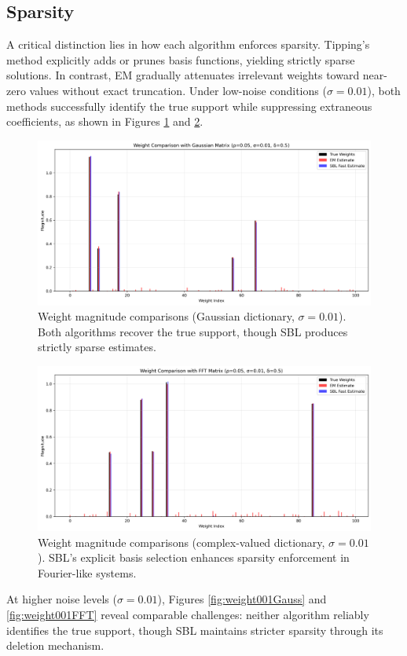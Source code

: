 \documentclass{article}
\begin{document}
\subsection{Sparsity}
A critical distinction lies in how each algorithm enforces sparsity. Tipping’s method explicitly adds or prunes basis functions, yielding strictly sparse solutions. In contrast, EM gradually attenuates irrelevant weights toward near-zero values without exact truncation. Under low-noise conditions ($\sigma=0.01$), both methods successfully identify the true support while suppressing extraneous coefficients, as shown in Figures \ref{fig:weight01Gauss} and \ref{fig:weight01FFT}.
\begin{figure}[H]
    \centering
    \includegraphics[width=0.75\linewidth]{Figures/weight_comparison_Gaussian_simga0.01.png}
    \caption{Weight magnitude comparisons (Gaussian dictionary, $\sigma=0.01$). Both algorithms recover the true support, though SBL produces strictly sparse estimates.}
    \label{fig:weight01Gauss}
\end{figure}
\begin{figure}[H]
    \centering
    \includegraphics[width=0.75\linewidth]{Figures/weight_comparison_FFT_simga0.01.png}
    \caption{Weight magnitude comparisons (complex-valued dictionary, $\sigma=0.01$). SBL’s explicit basis selection enhances sparsity enforcement in Fourier-like systems.}
    \label{fig:weight01FFT}
\end{figure}

At higher noise levels ($\sigma=0.01$), Figures \ref{fig:weight001Gauss} and \ref{fig:weight001FFT} reveal comparable challenges: neither algorithm reliably identifies the true support, though SBL maintains stricter sparsity through its deletion mechanism.
\end{document}
